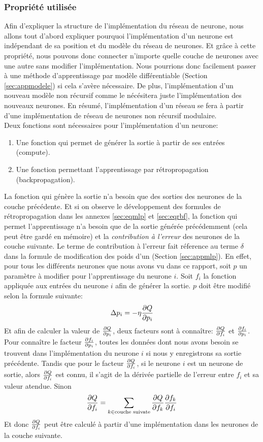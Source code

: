 \documentclass[12pt,a4paper,oneside, titlepage]{article}
\begin{document}
\subsubsection{Propriété utilisée}
Afin d'expliquer la structure de l'implémentation du réseau de neurone, nous allons tout d'abord expliquer pourquoi l'implémentation d'un neurone est indépendant de sa position et du modèle du réseau de neurones.
Et grâce à cette propriété, nous pouvons donc connecter n'importe quelle couche de neurones avec une autre sans modifier l'implémentation.
Nous pourrions donc facilement passer à une méthode d'apprentissage par modèle différentiable (Section \ref{sec:appmodele}) si cela s'avère nécessaire.
De plus, l'implémentation d'un nouveau modèle non récursif comme le \mlp nécésitera juste l'implémentation des nouveaux neurones.
En résumé, l'implémentation d'un réseau \rbf se fera à partir d'une implémentation de réseau de neurones non récursif modulaire.\\

Deux fonctions sont nécessaires pour l'implémentation d'un neurone:
\begin{enumerate}
 \item Une fonction qui permet de générer la sortie à partir de ses entrées (compute).
 \item Une fonction permettant l'apprentissage par rétropropagation (backpropagation).
\end{enumerate}
La fonction qui génère la sortie n'a besoin que des sorties des neurones de la couche précédente.
Et si on observe le développement des formules de rétropropagation dans les annexes \ref{sec:eqmlp} et \ref{sec:eqrbf},
la fonction qui permet l'apprentissage n'a besoin que de la sortie générée précédemment (cela peut être gardé en mémoire) et la \emph{contribution à l'erreur} des neurones de la couche suivante.
Le terme de contribution à l'erreur fait réference au terme $\delta$ dans la formule de modification des poids d'un \mlp (Section \ref{sec:appmlp}).
En effet, pour tous les différents neurones que nous avons vu dans ce rapport, soit $p$ un paramètre à modifier pour l'apprentissage du neurone $i$.
Soit $f_i$ la fonction appliquée aux entrées du neurone $i$ afin de générer la sortie.
$p$ doit être modifié selon la formule suivante:
\[\Delta p_i = -\eta \frac{\partial Q}{\partial p_i}\]
Et afin de calculer la valeur de $\frac{\partial Q}{\partial p_i}$, deux facteurs sont à connaître: $\frac{\partial Q}{\partial f_i}$ et $\frac{\partial f_i}{\partial p_i}$.
Pour connaître le facteur $\frac{\partial f_i}{\partial p_i}$, toutes les données dont nous avons besoin se trouvent dans l'implémentation du neurone $i$ si nous y enregistrons sa sortie précédente.
Tandis que pour le facteur $\frac{\partial Q}{\partial f_i}$,
si le neurone $i$ est un neurone de sortie, alors $\frac{\partial Q}{\partial f_i}$ est connu, il s'agit de la dérivée partielle de l'erreur entre $f_i$ et sa valeur atendue.
Sinon $$\frac{\partial Q}{\partial f_i} = \sum_{k \in \text{couche suivate}}\frac{\partial Q}{\partial f_k}\frac{\partial f_k}{\partial f_i}$$
Et donc $\frac{\partial Q}{\partial f_i}$ peut être calculé à partir d'une implémentation dans les neurones de la couche suivante.
\end{document}
